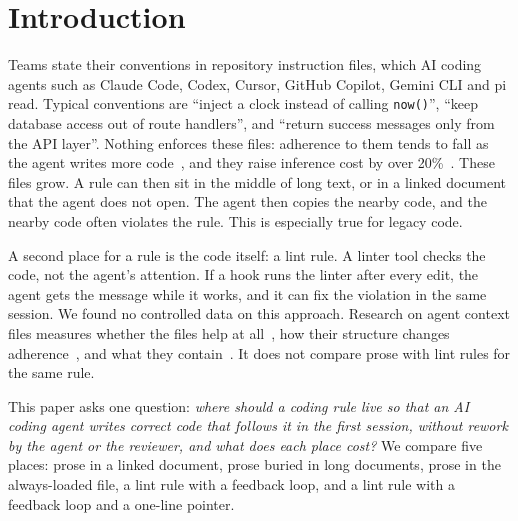 \documentclass[pdflatex,sn-mathphys-num]{sn-jnl}
\begin{document}
\section{Introduction}
\label{sec:intro}

Teams state their conventions in repository instruction files, which AI coding agents such as Claude Code, Codex, Cursor, GitHub Copilot, Gemini CLI and pi read.
Typical conventions are ``inject a clock instead of calling \texttt{now()}'', ``keep database access out of route handlers'', and ``return success messages only from the API layer''.
Nothing enforces these files: adherence to them tends to fall as the agent writes more code~\cite{mcmillan2026adherence}, and they raise inference cost by over 20\%~\cite{gloaguen2026agentsmd}.
These files grow.
A rule can then sit in the middle of long text, or in a linked document that the agent does not open.
The agent then copies the nearby code, and the nearby code often violates the rule.
This is especially true for legacy code.

A second place for a rule is the code itself: a lint rule.
A linter tool checks the code, not the agent's attention.
If a hook runs the linter after every edit, the agent gets the message while it works, and it can fix the violation in the same session.
We found no controlled data on this approach.
Research on agent context files measures whether the files help at all~\cite{gloaguen2026agentsmd,khatri2026contextfiles}, how their structure changes adherence~\cite{mcmillan2026adherence}, and what they contain~\cite{chatlatanagulchai2025agentreadmes}.
It does not compare prose with lint rules for the same rule.

This paper asks one question:
\emph{where should a coding rule live so that an AI coding agent writes correct code that follows it in the first session, without rework by the agent or the reviewer, and what does each place cost?}
We compare five places: prose in a linked document, prose buried in long documents, prose in the always-loaded file, a lint rule with a feedback loop, and a lint rule with a feedback loop and a one-line pointer.
\end{document}

